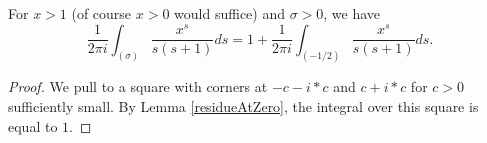 \begin{lemma}[residuePull1]
\label{residuePull1}
\leanok
For $x>1$ (of course $x>0$ would suffice) and $\sigma>0$, we have
  $$
  \frac1{2\pi i}
  \int_{(\sigma)}\frac{x^s}{s(s+1)}ds =1
  +
  \frac 1{2\pi i}
  \int_{(-1/2)}\frac{x^s}{s(s+1)}ds.
  $$
\end{lemma}
\begin{proof}
\leanok
We pull to a square with corners at $-c-i*c$ and $c+i*c$ for $c>0$
  sufficiently small.
  By Lemma \ref{residueAtZero}, the integral over this square is equal to $1$.
\end{proof}
